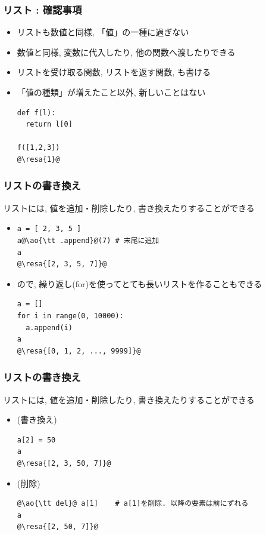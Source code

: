 \documentclass[10pt,dvipdfmx]{beamer}
\newcommand{\ore}[1]{{\color{orange}#1}}
\newcommand{\ao}[1]{{\color{blue}#1}}
\newcommand{\resa}[1]{\ore{\textsl{$\rightarrow$ #1}}}
\begin{document}
\begin{frame}[fragile]
\frametitle{リスト : 確認事項}
\begin{itemize}
\item リストも数値と同様, 「値」の一種に過ぎない
\item 数値と同様, 変数に代入したり, 他の関数へ渡したりできる
\item リストを受け取る関数, リストを返す関数, も書ける
\item \ao{「値の種類」が増えたこと以外, 新しいことはない}
\begin{lstlisting}
def f(l):
  return l[0]

f([1,2,3]) 
@\resa{1}@
\end{lstlisting}
\end{itemize}
\end{frame}


\begin{frame}[fragile]
\frametitle{リストの書き換え}
リストには, 値を追加・削除したり, 書き換えたりすることができる
\begin{itemize}
\item []
\begin{lstlisting}
a = [ 2, 3, 5 ]
a@\ao{\tt .append}@(7) # 末尾に追加
a
@\resa{[2, 3, 5, 7]}@
\end{lstlisting}
\item []
ので, 繰り返し(for)を使ってとても長いリストを作ることもできる
\begin{lstlisting}
a = []
for i in range(0, 10000):
  a.append(i)
a
@\resa{[0, 1, 2, ..., 9999]}@  
\end{lstlisting}
\end{itemize}
\end{frame}

\begin{frame}[fragile]
\frametitle{リストの書き換え}
リストには, 値を追加・削除したり, 書き換えたりすることができる
\begin{itemize}
\item [] (書き換え)
\begin{lstlisting}
a[2] = 50
a
@\resa{[2, 3, 50, 7]}@
\end{lstlisting}
\item [] (削除)
\begin{lstlisting}
@\ao{\tt del}@ a[1]    # a[1]を削除. 以降の要素は前にずれる
a
@\resa{[2, 50, 7]}@
\end{lstlisting}
\end{itemize}
\end{frame}
\end{document}
